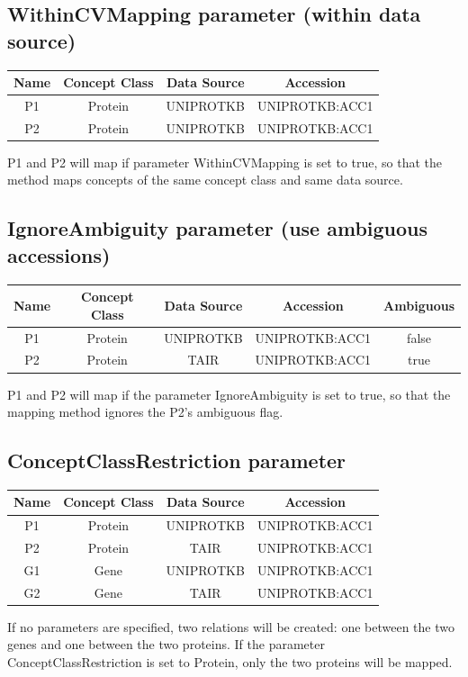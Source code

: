 \subsection{WithinCVMapping parameter (within data source)}
\begin{center}
\begin{tabular}{|c|c|c|c|}\hline
Name & Concept Class & Data Source & Accession\\ \hline			
P1 & Protein & UNIPROTKB & UNIPROTKB:ACC1\\
P2 & Protein & UNIPROTKB & UNIPROTKB:ACC1\\
\hline  
\end{tabular}
\end{center}
\vspace{0.5cm}
P1 and P2 will map if parameter WithinCVMapping is set to true, so that the method maps concepts of the same concept class and same data source.

\subsection{IgnoreAmbiguity parameter (use ambiguous accessions)}
\begin{center}
\begin{tabular}{|c|c|c|c|c|}\hline
Name & Concept Class & Data Source & Accession & Ambiguous\\ \hline			
P1 & Protein & UNIPROTKB & UNIPROTKB:ACC1 & false\\
P2 & Protein & TAIR & UNIPROTKB:ACC1 & true\\
\hline  
\end{tabular}
\end{center}
\vspace{0.5cm}
P1 and P2 will map if the parameter IgnoreAmbiguity is set to true, so that the mapping method ignores the P2's ambiguous flag.

\subsection{ConceptClassRestriction parameter}
\begin{center}
\begin{tabular}{|c|c|c|c|}\hline
Name & Concept Class & Data Source & Accession\\ \hline			
P1 & Protein & UNIPROTKB & UNIPROTKB:ACC1\\
P2 & Protein & TAIR & UNIPROTKB:ACC1\\
G1 & Gene & UNIPROTKB & UNIPROTKB:ACC1\\
G2 & Gene & TAIR & UNIPROTKB:ACC1\\
\hline  
\end{tabular}
\end{center}
\vspace{0.5cm}
If no parameters are specified, two relations will be created: one between the two genes and one between the two proteins.
If the parameter ConceptClassRestriction is set to Protein, only the two proteins will be mapped.

